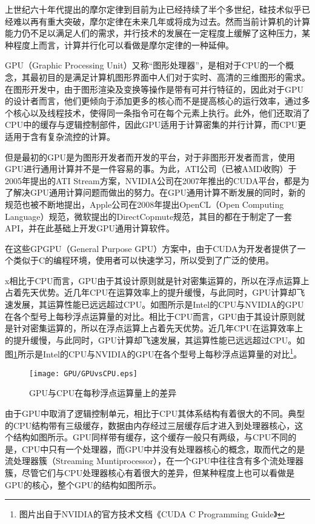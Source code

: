 
上世纪六十年代提出的摩尔定律到目前为止已经持续了半个多世纪，硅技术似乎已经难以再有重大突破，摩尔定律在未来几年或将成为过去。然而当前计算机的计算能力仍不足以满足人们的需求，并行技术的发展在一定程度上缓解了这种压力，某种程度上而言，计算并行化可以看做是摩尔定律的一种延伸。

GPU（Graphic Processing Unit）又称“图形处理器”，是相对于CPU的一个概念，其最初目的是满足计算机图形界面中人们对于实时、高清的三维图形的需求。在图形开发中，由于图形渲染及变换等操作是带有可并行特征的，因此对于GPU的设计者而言，他们更倾向于添加更多的核心而不是提高核心的运行效率，通过多个核心以及线程技术，使得同一条指令可在每个元素上执行。此外，他们还取消了CPU中的缓存与逻辑控制部件，因此GPU适用于计算密集的并行计算，而CPU更适用于含有复杂流控的计算。

但是最初的GPU是为图形开发者而开发的平台，对于非图形开发者而言，使用GPU进行通用计算并不是一件容易的事。为此，ATI公司（已被AMD收购）于2005年提出的ATI Stream方案，NVIDIA公司在2007年推出的CUDA平台，都是为了解决GPU通用计算问题而做出的努力。在GPU通用计算不断发展的同时，新的规范也被不断地提出，Apple公司在2008年提出OpenCL（Open Computing Language）规范，微软提出的DirectCopmute规范，其目的都在于制定了一套API，并在此基础上开发GPU通用计算软件。

在这些GPGPU（General Purpose GPU）方案中，由于CUDA为开发者提供了一个类似于C的编程环境，使用者可以快速学习，所以受到了广泛的使用。


x相比于CPU而言，GPU由于其设计原则就是针对密集运算的，所以在浮点运算上占着先天优势。近几年CPU在运算效率上的提升缓慢，与此同时，GPU计算却飞速发展，其运算性能已远远超过CPU。如图所示是Intel的CPU与NVIDIA的GPU在各个型号上每秒浮点运算量的对比。相比于CPU而言，GPU由于其设计原则就是针对密集运算的，所以在浮点运算上占着先天优势。近几年CPU在运算效率上的提升缓慢，与此同时，GPU计算却飞速发展，其运算性能已远远超过CPU。如图\ref{img:GPUvsCPU}所示是Intel的CPU与NVIDIA的GPU在各个型号上每秒浮点运算量的对比\footnote{图片出自于NVIDIA的官方技术文档《CUDA C Programming Guide》}。

\begin{figure}[!htbp]
\centering
\texttt{[image: GPU/GPUvsCPU.eps]}
\caption{GPU与CPU在每秒浮点运算量上的差异}
\label{img:GPUvsCPU}
\end{figure}

由于GPU中取消了逻辑控制单元，相比于CPU其体系结构有着很大的不同。典型的CPU结构带有三级缓存，数据由内存经过三层缓存后才进入到处理器核心，这个结构如图所示。GPU同样带有缓存，这个缓存一般只有两级，与CPU不同的是，CPU中只有一个处理器，而GPU中并没有处理器核心的概念，取而代之的是流处理器簇（Streaming Muntiprocessor），在一个GPU中往往含有多个流处理器簇，尽管它们与CPU处理器核心有着很大的差异，但某种程度上也可以看做是GPU的核心，整个GPU的结构如图所示。

